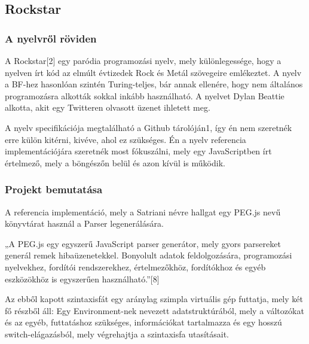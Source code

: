 \subsection{Rockstar}

\subsubsection{A nyelvről röviden}

A Rockstar[2] egy paródia programozási nyelv, mely különlegessége, hogy a nyelven írt kód az elmúlt évtizedek Rock és Metál szövegeire emlékeztet. A nyelv a BF-hez hasonlóan szintén Turing-teljes, bár annak ellenére, hogy nem általános programozásra alkották sokkal inkább használható. A nyelvet Dylan Beattie alkotta, akit egy Twitteren olvasott üzenet ihletett meg.

A nyelv specifikációja megtalálható a Github tárolóján1, így én nem szeretnék erre külön kitérni, kivéve, ahol ez szükséges. Én a nyelv referencia implementációjára szeretnék most fókuszálni, mely egy JavaScriptben írt értelmező, mely a böngészőn belül és azon kívül is működik.

\subsubsection{Projekt bemutatása}

A referencia implementáció, mely a Satriani névre hallgat egy PEG.js nevű könyvtárat használ a Parser legenerálására.

„A PEG.js egy egyszerű JavaScript parser generátor, mely gyors parsereket generál remek hibaüzenetekkel. Bonyolult adatok feldolgozására, programozási nyelvekhez, fordítói rendszerekhez, értelmezőkhöz, fordítókhoz és egyéb eszközökhöz is egyszerűen használható.”[8]

Az ebből kapott szintaxisfát egy aránylag szimpla virtuális gép futtatja, mely két fő részből áll: Egy Environment-nek nevezett adatstruktúrából, mely a változókat és az egyéb, futtatáshoz szükséges, információkat tartalmazza és egy hosszú switch-elágazásból, mely végrehajtja a szintaxisfa utasításait.